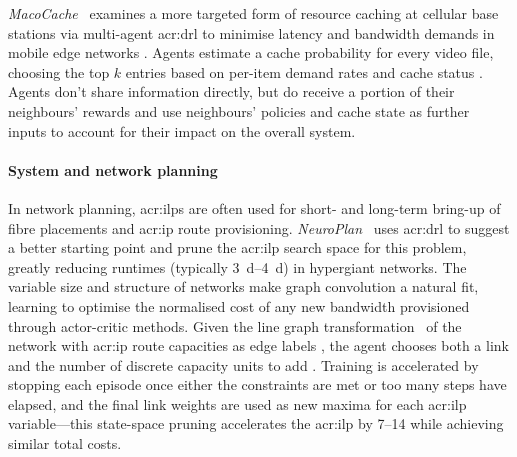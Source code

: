 \emph{MacoCache}~\parencite{DBLP:conf/infocom/Wang0LSS20} examines a more targeted form of resource caching at cellular base stations via multi-agent \gls{acr:drl} to minimise latency and bandwidth demands in mobile edge networks \prllitreward.
Agents estimate a cache probability for every video file, choosing the top $k$ entries \prllitactreal{} based on per-item demand rates and cache status \prllitstate.
Agents don't share information directly, but do receive a portion of their neighbours' rewards and use neighbours' policies and cache state as further inputs to account for their impact on the overall system.

\paragraph{System and network planning}
In network planning, \glspl{acr:ilp} are often used for short- and long-term bring-up of fibre placements and \gls{acr:ip} route provisioning.
\emph{NeuroPlan}~\parencite{DBLP:conf/sigcomm/ZhuGATZJ21} uses \gls{acr:drl} to suggest a better starting point and prune the \gls{acr:ilp} search space for this problem, greatly reducing runtimes (typically \qtyrange{3}{4}{\day}) in hypergiant networks.
The variable size and structure of networks make graph convolution a natural fit, learning to optimise the normalised cost of any new bandwidth provisioned \prllitreward{} through actor-critic methods.
Given the line graph transformation~\parencite{Harary1960} of the network with \gls{acr:ip} route capacities as edge labels \prllitstate, the agent chooses both a link and the number of discrete capacity units to add \prllitact.
Training is accelerated by stopping each episode once either the constraints are met or too many steps have elapsed, and the final link weights are used as new maxima for each \gls{acr:ilp} variable---this state-space pruning accelerates the \gls{acr:ilp} by \qtyrange{7}{14}{\times} while achieving similar total costs.

